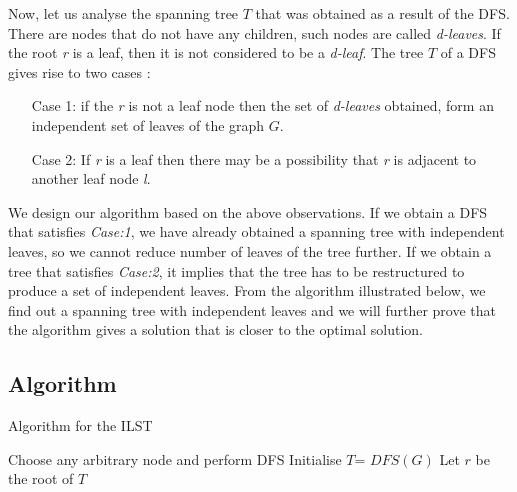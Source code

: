 \documentclass[12pt]{article}
\theoremstyle{plain}
\begin{document}
Now, let us analyse the spanning tree $T$ that was obtained as a result of the DFS. There are nodes that do not have any children, such nodes are called \textit{d-leaves}. If the root \textit{r} is a leaf, then it is not considered to be a \textit{d-leaf}. The tree $T$ of a DFS gives rise to two cases :
\begin{enumerate}
\item[Case 1:]  if the \textit{r} is not a leaf node then the set of \textit{d-leaves} obtained, form an independent set of leaves of the graph $G$.
\item[Case 2:] If \textit{r} is a leaf then there may be a possibility that \textit{r} is adjacent to another leaf node  \textit{l}.
\end{enumerate}

We design our algorithm based on the above observations. If we obtain a DFS that satisfies \textit{Case:1}, we have already obtained a spanning tree with independent leaves, so we cannot reduce number of leaves of the tree further. If we obtain a tree that satisfies \textit{Case:2}, it implies that the tree has to be restructured to produce a set of independent leaves. From the algorithm illustrated below, we find out a spanning tree with independent leaves and we will further prove that the algorithm gives a solution that is closer to the optimal solution. 

\subsection*{Algorithm}

\begin{minipage}{1.\linewidth}
\begin{algorithm2e}[H]
\caption{Algorithm for the ILST}
\label{alg:min leaf spanning tree}

Choose any arbitrary node and perform DFS\;
Initialise $T$= $DFS(G)$\; \vspace{.1cm}
Let $r$ be the root of $T$ \; \vspace{.1cm}


\end{algorithm2e}
\end{minipage}
\end{document}
